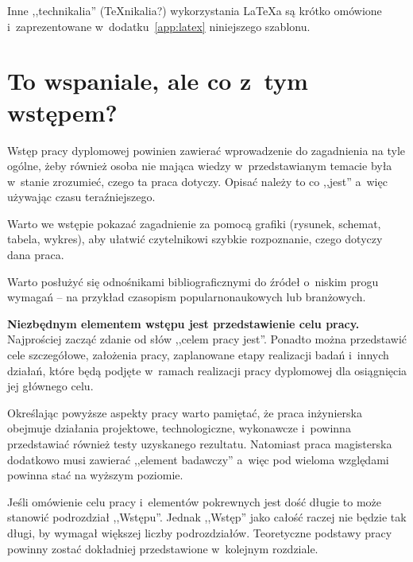 Inne ,,technikalia'' (\TeX{nikalia}?) wykorzystania \LaTeX{a} są krótko omówione i~zaprezentowane w~dodatku~\ref{app:latex} niniejszego szablonu.

\section{To wspaniale, ale co z~tym wstępem?}

Wstęp pracy dyplomowej powinien zawierać wprowadzenie do zagadnienia na tyle ogólne, żeby również osoba nie mająca wiedzy w~przedstawianym temacie była w~stanie zrozumieć, czego ta praca dotyczy. Opisać należy to co ,,jest'' a~więc używając czasu teraźniejszego.

Warto we wstępie pokazać zagadnienie za pomocą grafiki (rysunek, schemat, tabela, wykres), aby ułatwić czytelnikowi szybkie rozpoznanie, czego dotyczy dana praca.

Warto posłużyć się odnośnikami bibliograficznymi do źródeł o~niskim progu wymagań -- na przykład czasopism popularnonaukowych lub branżowych.

\textbf{Niezbędnym elementem wstępu jest przedstawienie celu pracy.} Najprościej zacząć zdanie od słów ,,celem pracy jest''. Ponadto można przedstawić cele szczegółowe, założenia pracy, zaplanowane etapy realizacji badań i~innych działań, które będą podjęte w~ramach realizacji pracy dyplomowej dla osiągnięcia jej głównego celu.

Określając powyższe aspekty pracy warto pamiętać, że praca inżynierska obejmuje działania projektowe, technologiczne, wykonawcze i~powinna przedstawiać również testy uzyskanego rezultatu. Natomiast praca magisterska dodatkowo musi zawierać ,,element badawczy'' a~więc pod wieloma względami powinna stać na wyższym poziomie.

Jeśli omówienie celu pracy i~elementów pokrewnych jest dość długie to może stanowić podrozdział ,,Wstępu''. Jednak ,,Wstęp'' jako całość raczej nie będzie tak długi, by wymagał większej liczby podrozdziałów. Teoretyczne podstawy pracy powinny zostać dokładniej przedstawione w~kolejnym rozdziale.